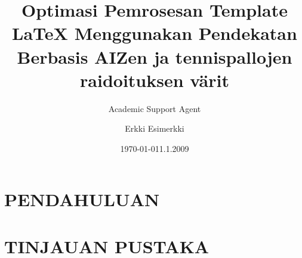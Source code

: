 \documentclass{vakioasiakirja}
\title{Optimasi Pemrosesan Template LaTeX Menggunakan Pendekatan Berbasis AI}
\author{Academic Support Agent}
\date{\today}
\begin{document}
\maketitle

\begin{abstract}

\end{abstract}

\chapter{PENDAHULUAN}


\chapter{TINJAUAN PUSTAKA}



\author{Erkki Esimerkki}
\address{
  Mallikatu 2 A 10\\
  12345 Hukkapiilo
}


\date{1.1.2009}

\title{Zen ja tennispallojen raidoituksen värit}
\end{document}
